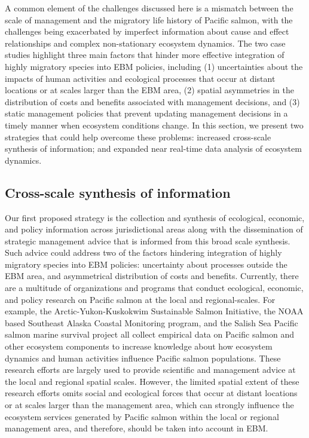 A common element of the challenges discussed here is a mismatch between
the scale of management and the migratory life history of Pacific
salmon, with the challenges being exacerbated by imperfect information
about cause and effect relationships and complex non-stationary
ecosystem dynamics. The two case studies highlight three main factors
that hinder more effective integration of highly migratory species into
EBM policies, including (1) uncertainties about the impacts of human
activities and ecological processes that occur at distant locations or
at scales larger than the EBM area, (2) spatial asymmetries in the
distribution of costs and benefits associated with management decisions,
and (3) static management policies that prevent updating management
decisions in a timely manner when ecosystem conditions change. In this
section, we present two strategies that could help overcome these
problems: increased cross-scale synthesis of information; and expanded
near real-time data analysis of ecosystem dynamics.

\subsection{Cross-scale synthesis of information}

Our first proposed strategy is the collection and synthesis of
ecological, economic, and policy information across jurisdictional areas
along with the dissemination of strategic management advice that is
informed from this broad scale synthesis. Such advice could address two
of the factors hindering integration of highly migratory species into
EBM policies: uncertainty about processes outside the EBM area, and
asymmetrical distribution of costs and benefits. Currently, there are a
multitude of organizations and programs that conduct ecological,
economic, and policy research on Pacific salmon at the local and
regional-scales. For example, the Arctic-Yukon-Kuskokwim Sustainable
Salmon Initiative, the NOAA based Southeast Alaska Coastal Monitoring
program, and the Salish Sea Pacific salmon marine survival project all
collect empirical data on Pacific salmon and other ecosystem components
to increase knowledge about how ecosystem dynamics and human activities
influence Pacific salmon populations. These research efforts are largely
used to provide scientific and management advice at the local and
regional spatial scales. However, the limited spatial extent of these
research efforts omits social and ecological forces that occur at
distant locations or at scales larger than the management area, which
can strongly influence the ecosystem services generated by Pacific
salmon within the local or regional management area, and therefore,
should be taken into account in EBM.


